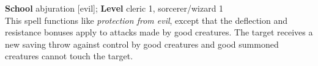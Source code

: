 \textbf{School} abjuration [evil]; \textbf{Level} cleric 1, sorcerer/wizard 1\\
This spell functions like \textit{protection from evil}, except that the deflection and resistance bonuses apply to attacks made by good creatures. The target receives a new saving throw against control by good creatures and good summoned creatures cannot touch the target.\\
